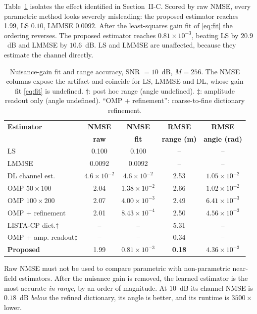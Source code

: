 \documentclass[journal]{IEEEtran}
\begin{document}
Table~\ref{tab:metric} isolates the effect identified in Section~II-C. Scored by raw NMSE, every parametric method looks severely misleading: the proposed estimator reaches 1.99, LS $0.10$, LMMSE $0.0092$. After the least-squares gain fit of \eqref{eq:fit} the ordering reverses. The proposed estimator reaches $0.81\times10^{-3}$, beating LS by $20.9$~dB and LMMSE by $10.6$~dB. LS and LMMSE are unaffected, because they estimate the channel directly.

\begin{table}[t]
\centering
\caption{Nuisance-gain fit and range accuracy, SNR $=10$~dB, $M=256$. The NMSE columns expose the artifact and coincide for LS, LMMSE and DL, whose gain fit \eqref{eq:fit} is undefined. $\dagger$: post hoc range (angle undefined). $\ddagger$: amplitude readout only (angle undefined). ``OMP + refinement'': coarse-to-fine dictionary refinement.}
\label{tab:metric}
\footnotesize
\setlength{\tabcolsep}{1.5pt}
\renewcommand{\arraystretch}{0.94}
\begin{tabular}{@{}l c c c c@{}}
\hline
\textbf{Estimator} & \textbf{NMSE} & \textbf{NMSE} & \textbf{RMSE} & \textbf{RMSE}\\
 & \textbf{raw} & \textbf{fit} & \textbf{range (m)} & \textbf{angle (rad)}\\
\hline
LS & 0.100 & 0.100 & -- & --\\
LMMSE & 0.0092 & 0.0092 & -- & --\\
DL channel est. & $4.6\times10^{-2}$ & $4.6\times10^{-2}$ & 2.53 & $1.05\times10^{-2}$\\
OMP $50\times100$ & 2.04 & $1.38\times10^{-2}$ & 2.66 & $1.02\times10^{-2}$\\
OMP $100\times200$ & 2.07 & $4.00\times10^{-3}$ & 2.49 & $6.41\times10^{-3}$\\
OMP + refinement & 2.01 & $8.43\times10^{-4}$ & 2.50 & $4.56\times10^{-3}$\\
LISTA-CP dict.$\dagger$ & -- & -- & 5.31 & --\\
OMP + amp. readout$\ddagger$ & -- & -- & 0.34 & --\\
\hline
\textbf{Proposed} & 1.99 & $0.81\times10^{-3}$ & \textbf{0.18} & \textbf{$4.36\times10^{-3}$}\\
\hline
\end{tabular}
\end{table}

Raw NMSE must not be used to compare parametric with non-parametric near-field estimators. After the nuisance gain is removed, the learned estimator is the most accurate \emph{in range}, by an order of magnitude. At $10$~dB its channel NMSE is $0.18$~dB \emph{below} the refined dictionary, its angle is better, and its runtime is $3500\times$ lower.
\end{document}
